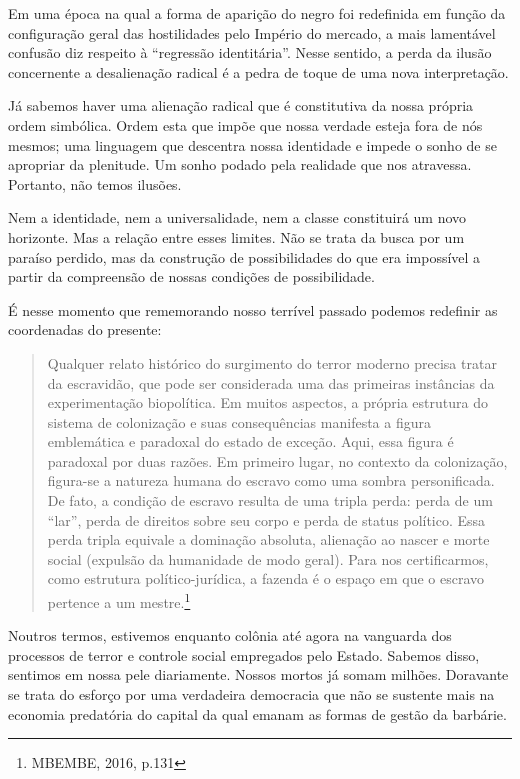 Em uma época na qual a forma de aparição do negro foi redefinida em
função da configuração geral das hostilidades pelo Império do mercado, a
mais lamentável confusão diz respeito à ``regressão identitária''. Nesse
sentido, a perda da ilusão concernente a desalienação radical é a pedra
de toque de uma nova interpretação.

Já sabemos haver uma alienação radical que é constitutiva da nossa
própria ordem simbólica. Ordem esta que impõe que nossa verdade esteja
fora de nós mesmos; uma linguagem que descentra nossa identidade e
impede o sonho de se apropriar da plenitude. Um sonho podado pela
realidade que nos atravessa. Portanto, não temos ilusões.

Nem a identidade, nem a universalidade, nem a classe constituirá um novo
horizonte. Mas a relação entre esses limites. Não se trata da busca por
um paraíso perdido, mas da construção de possibilidades do que era
impossível a partir da compreensão de nossas condições de possibilidade.

É nesse momento que rememorando nosso terrível passado podemos redefinir
as coordenadas do presente:

\begin{quote}
Qualquer relato histórico do surgimento do terror moderno precisa tratar
da escravidão, que pode ser considerada uma das primeiras instâncias da
experimentação biopolítica. Em muitos aspectos, a própria estrutura do
sistema de colonização e suas consequências manifesta a figura
emblemática e paradoxal do estado de exceção. Aqui, essa figura é
paradoxal por duas razões. Em primeiro lugar, no contexto da
colonização, figura-se a natureza humana do escravo como uma sombra
personificada. De fato, a condição de escravo resulta de uma tripla
perda: perda de um ``lar'', perda de direitos sobre seu corpo e perda de
status político. Essa perda tripla equivale a dominação absoluta,
alienação ao nascer e morte social (expulsão da humanidade de modo
geral). Para nos certificarmos, como estrutura político-jurídica, a
fazenda é o espaço em que o escravo pertence a um mestre.\footnote{MBEMBE,
  2016, p.131}
\end{quote}

Noutros termos, estivemos enquanto colônia até agora na vanguarda dos
processos de terror e controle social empregados pelo Estado. Sabemos
disso, sentimos em nossa pele diariamente. Nossos mortos já somam
milhões. Doravante se trata do esforço por uma verdadeira democracia que
não se sustente mais na economia predatória do capital da qual emanam as
formas de gestão da barbárie.

